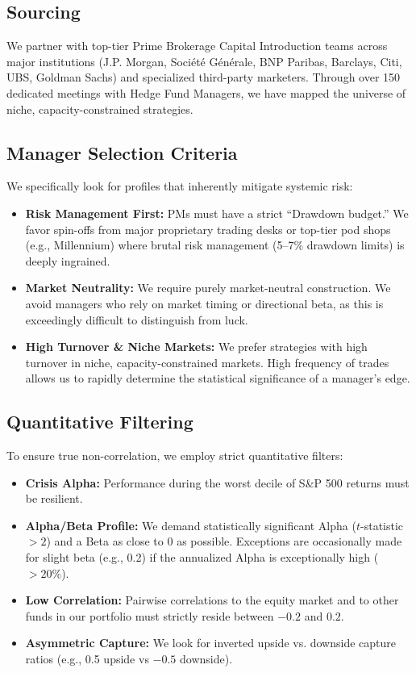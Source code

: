 \documentclass[11pt, a4paper]{article}
\begin{document}
\subsection{Sourcing}
We partner with top-tier Prime Brokerage Capital Introduction teams across major institutions (J.P. Morgan, Société Générale, BNP Paribas, Barclays, Citi, UBS, Goldman Sachs) and specialized third-party marketers. Through over 150 dedicated meetings with Hedge Fund Managers, we have mapped the universe of niche, capacity-constrained strategies.

\subsection{Manager Selection Criteria}
We specifically look for profiles that inherently mitigate systemic risk:
\begin{itemize}
    \item \textbf{Risk Management First:} PMs must have a strict ``Drawdown budget.'' We favor spin-offs from major proprietary trading desks or top-tier pod shops (e.g., Millennium) where brutal risk management (5--7\% drawdown limits) is deeply ingrained.
    \item \textbf{Market Neutrality:} We require purely market-neutral construction. We avoid managers who rely on market timing or directional beta, as this is exceedingly difficult to distinguish from luck.
    \item \textbf{High Turnover \& Niche Markets:} We prefer strategies with high turnover in niche, capacity-constrained markets. High frequency of trades allows us to rapidly determine the statistical significance of a manager's edge.
\end{itemize}

\subsection{Quantitative Filtering}
To ensure true non-correlation, we employ strict quantitative filters:
\begin{itemize}
    \item \textbf{Crisis Alpha:} Performance during the worst decile of S\&P 500 returns must be resilient.
    \item \textbf{Alpha/Beta Profile:} We demand statistically significant Alpha ($t$-statistic $> 2$) and a Beta as close to 0 as possible. Exceptions are occasionally made for slight beta (e.g., 0.2) if the annualized Alpha is exceptionally high ($>20\%$).
    \item \textbf{Low Correlation:} Pairwise correlations to the equity market and to other funds in our portfolio must strictly reside between $-0.2$ and $0.2$.
    \item \textbf{Asymmetric Capture:} We look for inverted upside vs. downside capture ratios (e.g., 0.5 upside vs $-0.5$ downside).
\end{itemize}
\end{document}

